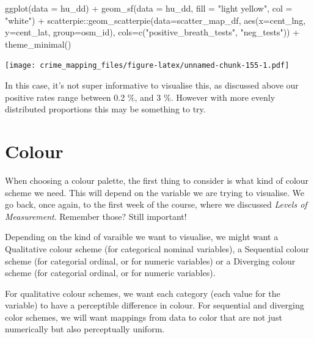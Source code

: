 \documentclass[
]{book}
\newenvironment{Shaded}{\begin{snugshade}}{\end{snugshade}}
\newcommand{\AttributeTok}[1]{\textcolor[rgb]{0.77,0.63,0.00}{#1}}
\newcommand{\FunctionTok}[1]{\textcolor[rgb]{0.00,0.00,0.00}{#1}}
\newcommand{\NormalTok}[1]{#1}
\newcommand{\SpecialCharTok}[1]{\textcolor[rgb]{0.00,0.00,0.00}{#1}}
\newcommand{\StringTok}[1]{\textcolor[rgb]{0.31,0.60,0.02}{#1}}
\begin{document}
\begin{Shaded}
\begin{Highlighting}[]
\FunctionTok{ggplot}\NormalTok{(}\AttributeTok{data =}\NormalTok{ hu\_dd) }\SpecialCharTok{+} 
  \FunctionTok{geom\_sf}\NormalTok{(}\AttributeTok{data =}\NormalTok{ hu\_dd, }\AttributeTok{fill =} \StringTok{"light yellow"}\NormalTok{, }\AttributeTok{col =} \StringTok{"white"}\NormalTok{) }\SpecialCharTok{+} 
\NormalTok{  scatterpie}\SpecialCharTok{::}\FunctionTok{geom\_scatterpie}\NormalTok{(}\AttributeTok{data=}\NormalTok{scatter\_map\_df, }\FunctionTok{aes}\NormalTok{(}\AttributeTok{x=}\NormalTok{cent\_lng, }\AttributeTok{y=}\NormalTok{cent\_lat, }\AttributeTok{group=}\NormalTok{osm\_id), }\AttributeTok{cols=}\FunctionTok{c}\NormalTok{(}\StringTok{"positive\_breath\_tests"}\NormalTok{, }\StringTok{"neg\_tests"}\NormalTok{)) }\SpecialCharTok{+} 
  \FunctionTok{theme\_minimal}\NormalTok{()}
\end{Highlighting}
\end{Shaded}

\texttt{[image: crime\_mapping\_files/figure-latex/unnamed-chunk-155-1.pdf]}

In this case, it's not super informative to visualise this, as discussed above our positive rates range between 0.2 \%, and 3 \%. However with more evenly distributed proportions this may be something to try.

\hypertarget{colour}{%
\section{Colour}\label{colour}}

When choosing a colour palette, the first thing to consider is what kind of colour scheme we need. This will depend on the variable we are trying to visualise. We go back, once again, to the first week of the course, where we discussed \emph{Levels of Measurement}. Remember those? Still important!

Depending on the kind of varaible we want to visualise, we might want a Qualitative colour scheme (for categorical nominal variables), a Sequential colour scheme (for categorial ordinal, or for numeric variables) or a Diverging colour scheme (for categorial ordinal, or for numeric variables).

For qualitative colour schemes, we want each category (each value for the variable) to have a perceptible difference in colour. For sequential and diverging color schemes, we will want mappings from data to color that are not just numerically but also perceptually uniform.
\end{document}
